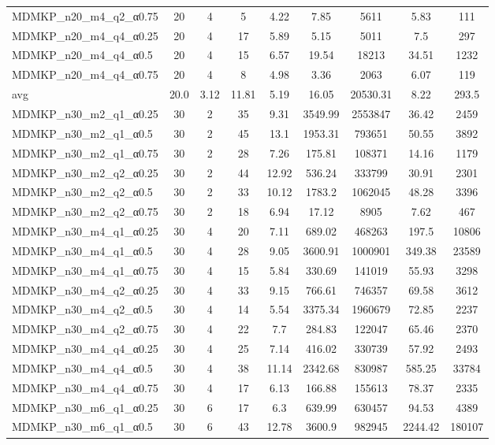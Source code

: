 \begin{table}[!ht]
{\begin{tabular}{lcccccccc}
MDMKP\_n20\_m4\_q2\_α0.75 & 20 & 4 & 5 & 4.22 & 7.85 & 5611 & 5.83 & 111 \\
MDMKP\_n20\_m4\_q4\_α0.25 & 20 & 4 & 17 & 5.89 & 5.15 & 5011 & 7.5 & 297 \\
MDMKP\_n20\_m4\_q4\_α0.5 & 20 & 4 & 15 & 6.57 & 19.54 & 18213 & 34.51 & 1232 \\
MDMKP\_n20\_m4\_q4\_α0.75 & 20 & 4 & 8 & 4.98 & 3.36 & 2063 & 6.07 & 119 \\
\hline avg & 20.0 & 3.12 & 11.81& 5.19 & 16.05& 20530.31 & 8.22& 293.5\\ \hline
MDMKP\_n30\_m2\_q1\_α0.25 & 30 & 2 & 35 & 9.31 & 3549.99 & 2553847 & 36.42 & 2459 \\
MDMKP\_n30\_m2\_q1\_α0.5 & 30 & 2 & 45 & 13.1 & 1953.31 & 793651 & 50.55 & 3892 \\
MDMKP\_n30\_m2\_q1\_α0.75 & 30 & 2 & 28 & 7.26 & 175.81 & 108371 & 14.16 & 1179 \\
MDMKP\_n30\_m2\_q2\_α0.25 & 30 & 2 & 44 & 12.92 & 536.24 & 333799 & 30.91 & 2301 \\
MDMKP\_n30\_m2\_q2\_α0.5 & 30 & 2 & 33 & 10.12 & 1783.2 & 1062045 & 48.28 & 3396 \\
MDMKP\_n30\_m2\_q2\_α0.75 & 30 & 2 & 18 & 6.94 & 17.12 & 8905 & 7.62 & 467 \\
MDMKP\_n30\_m4\_q1\_α0.25 & 30 & 4 & 20 & 7.11 & 689.02 & 468263 & 197.5 & 10806 \\
MDMKP\_n30\_m4\_q1\_α0.5 & 30 & 4 & 28 & 9.05 & 3600.91 & 1000901 & 349.38 & 23589 \\
MDMKP\_n30\_m4\_q1\_α0.75 & 30 & 4 & 15 & 5.84 & 330.69 & 141019 & 55.93 & 3298 \\
MDMKP\_n30\_m4\_q2\_α0.25 & 30 & 4 & 33 & 9.15 & 766.61 & 746357 & 69.58 & 3612 \\
MDMKP\_n30\_m4\_q2\_α0.5 & 30 & 4 & 14 & 5.54 & 3375.34 & 1960679 & 72.85 & 2237 \\
MDMKP\_n30\_m4\_q2\_α0.75 & 30 & 4 & 22 & 7.7 & 284.83 & 122047 & 65.46 & 2370 \\
MDMKP\_n30\_m4\_q4\_α0.25 & 30 & 4 & 25 & 7.14 & 416.02 & 330739 & 57.92 & 2493 \\
MDMKP\_n30\_m4\_q4\_α0.5 & 30 & 4 & 38 & 11.14 & 2342.68 & 830987 & 585.25 & 33784 \\
MDMKP\_n30\_m4\_q4\_α0.75 & 30 & 4 & 17 & 6.13 & 166.88 & 155613 & 78.37 & 2335 \\
MDMKP\_n30\_m6\_q1\_α0.25 & 30 & 6 & 17 & 6.3 & 639.99 & 630457 & 94.53 & 4389 \\
MDMKP\_n30\_m6\_q1\_α0.5 & 30 & 6 & 43 & 12.78 & 3600.9 & 982945 & 2244.42 & 180107 \\

\end{tabular}}
\end{table}
